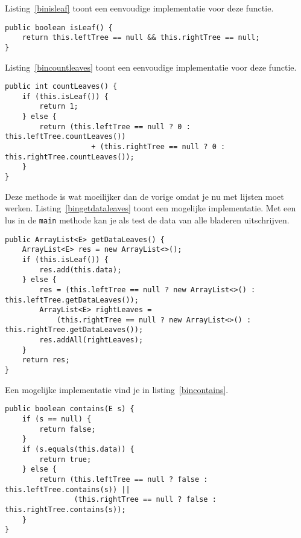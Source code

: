 \begin{Oplossing}{2.7}
Listing~\ref{binisleaf} toont een eenvoudige implementatie voor deze functie.
\begin{lstlisting}[caption={Is een knoop een blad?}, label=binisleaf]
public boolean isLeaf() {
	return this.leftTree == null && this.rightTree == null;
}
\end{lstlisting}
\end{Oplossing}
\begin{Oplossing}{2.8}
Listing~\ref{bincountleaves} toont een eenvoudige implementatie voor deze functie.
\begin{lstlisting}[caption={Hoeveel bladeren bevat deze boom?}, label=bincountleaves]
public int countLeaves() {
	if (this.isLeaf()) {
		return 1;
	} else {
		return (this.leftTree == null ? 0 : this.leftTree.countLeaves())
					+ (this.rightTree == null ? 0 : this.rightTree.countLeaves());
	}
}
\end{lstlisting}
\end{Oplossing}
\begin{Oplossing}{2.9}
Deze methode is wat moeilijker dan de vorige omdat je nu met lijsten moet werken. Listing~\ref{bingetdataleaves} toont een mogelijke implementatie. Met een lus in de \verb+main+ methode kan je als test de data van alle bladeren uitschrijven.
\begin{lstlisting}[caption={Genereer een lijst met de data van alle bladeren}, label=bingetdataleaves]
public ArrayList<E> getDataLeaves() {
	ArrayList<E> res = new ArrayList<>();
	if (this.isLeaf()) {
		res.add(this.data);
	} else {
		res = (this.leftTree == null ? new ArrayList<>() : this.leftTree.getDataLeaves());
		ArrayList<E> rightLeaves =
			(this.rightTree == null ? new ArrayList<>() : this.rightTree.getDataLeaves());
		res.addAll(rightLeaves);
	}
	return res;
}
\end{lstlisting}

\end{Oplossing}
\begin{Oplossing}{2.10}
Een mogelijke implementatie vind je in listing~\ref{bincontains}.
\begin{lstlisting}[caption={Komt een bepaalde waarde voor in een boom?}, label=bincontains]
public boolean contains(E s) {
	if (s == null) {
		return false;
	}
	if (s.equals(this.data)) {
		return true;
	} else {
		return (this.leftTree == null ? false : this.leftTree.contains(s)) ||
				(this.rightTree == null ? false : this.rightTree.contains(s));
	}
}
\end{lstlisting}

\end{Oplossing}
